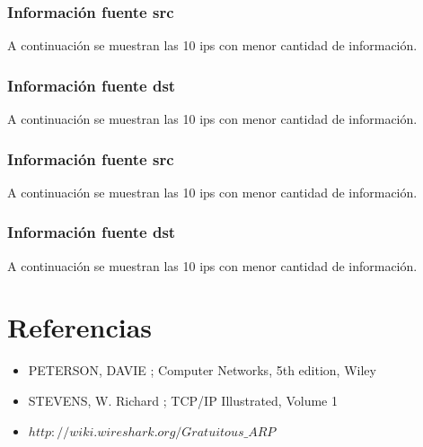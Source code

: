 \documentclass[10pt, a4paper]{article}
\begin{document}
\subsubsection{Informaci\'on fuente src}
A continuaci\'on se muestran las 10 ips con menor cantidad de informaci\'on.

%
\vspace{2cm}

\subsubsection{Informaci\'on fuente dst}
A continuaci\'on se muestran las 10 ips con menor cantidad de informaci\'on.

%
\vspace{2cm}


\subsubsection{Informaci\'on fuente src}
A continuaci\'on se muestran las 10 ips con menor cantidad de informaci\'on.

%
\vspace{2cm}

\subsubsection{Informaci\'on fuente dst}
A continuaci\'on se muestran las 10 ips con menor cantidad de informaci\'on.

%
\vspace{2cm}

\section{Referencias}
\begin{itemize}
\item PETERSON, DAVIE ; Computer Networks, 5th edition, Wiley
\item STEVENS, W. Richard ; TCP/IP Illustrated, Volume 1

\item $http://wiki.wireshark.org/Gratuitous\_ARP$
\end{itemize}
\end{document}
